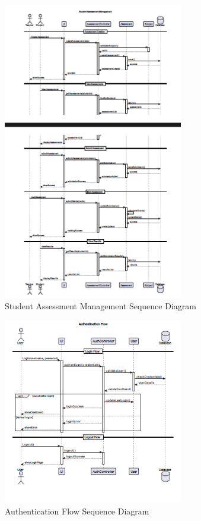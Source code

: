 \documentclass[12pt,a4paper]{report}
\begin{document}
\begin{figure}[htbp]
    \centering
    \includegraphics[width=0.7\textwidth]{student-assesment-management-sequence.png}
    \caption{Student Assessment Management Sequence Diagram}
    \label{fig:student-assessment-management-sequence}
\end{figure}

\begin{figure}[htbp]
    \centering
    \includegraphics[width=0.7\textwidth]{authentication-flow-sequence.png}
    \caption{Authentication Flow Sequence Diagram}
    \label{fig:authentication-flow-sequence}
\end{figure}
\end{document}
